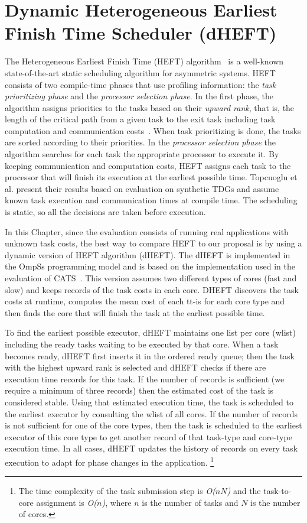 \section{Dynamic Heterogeneous Earliest Finish Time Scheduler (dHEFT)}
\label{sec.scheduling.heft}
The Heterogeneous Earliest Finish Time (HEFT) algorithm~\cite{HEFT} is a well-known state-of-the-art static scheduling algorithm for asymmetric systems.
HEFT consists of two compile-time phases that use profiling information: the \textit{task prioritizing phase} and the \textit{processor selection phase}.
In the first phase, the algorithm assigns priorities to the tasks based on their \textit{upward rank}, that is, the length of the critical path from a given task to the exit task including task computation and communication costs~\cite{HEFT}.
When task prioritizing is done, the tasks are sorted according to their priorities.
In the \textit{processor selection phase} the algorithm searches for each task the appropriate processor to execute it.
By keeping communication and computation costs, HEFT assigns each task to the processor that will finish its execution at the earliest possible time.
Topcuoglu et al. \cite{HEFT} present their results based on evaluation on synthetic TDGs and assume known task execution and communication times at compile time.
The scheduling is static, so all the decisions are taken before execution.

In this Chapter, since the evaluation consists of running real applications with unknown task costs, the best way to compare HEFT to our proposal is by using a dynamic version of HEFT algorithm (dHEFT).
The dHEFT is implemented in the OmpSs programming model and is based on the implementation used in the evaluation of CATS~\cite{Chronaki:ICS2015}.
This version assumes two different types of cores (fast and slow) and keeps records of the task costs in each core.
DHEFT discovers the task costs at runtime, computes the mean cost of each tt-is for each core type and then finds the core that will finish the task at the earliest possible time.

To find the earliest possible executor, dHEFT maintains
one list per core (wlist) including the ready tasks waiting
to be executed by that core. 
When a task becomes ready, dHEFT first inserts it in the ordered ready queue; then the task with the highest upward rank is selected and dHEFT checks if there are execution time records for this task. 
If the number of records is sufficient (we require a minimum of three records)
then the estimated cost of the task is considered stable. 
Using that estimated execution time, the task
is scheduled to the earliest executor by consulting the wlist
of all cores. If the number of records is not sufficient
for one of the core types, then the task is scheduled to the
earliest executor of this core type to get another record of
that task-type and core-type execution time. In all cases,
dHEFT updates the history of records on every task execution to adapt for phase changes in the application. \footnote{The time complexity of the task submission step is \textit{O($nN$)} and the task-to-core assignment is \textit{O($n$)}, where \textit{$n$} is the number of tasks and \textit{$N$} is the number of cores.}

